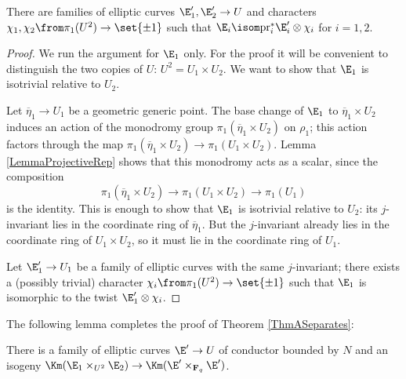 \documentclass{article}
\def\F{\mathbf{F}}
\begin{document}
\begin{lemma} \label{LemmaDescentToU} There are families of elliptic curves $\E_1',\E_2'\to U$ and characters 
$\chi_1,\chi_2\from \pi_1(U^2)\to \set{\pm{1}}$ such that $\E_i\isom \text{pr}_i^*\E_i'\otimes \chi_i$ for $i=1,2$.  
\end{lemma}

\begin{proof} We run the argument for $\E_1$ only.  For the proof it will be convenient to distinguish the two copies of $U$:  $U^2=U_1\times U_2$.  We want to show that $\E_1$ is isotrivial relative to $U_2$.  

Let $\overline{\eta}_1\to U_1$ be a geometric generic point.  The base change of $\E_1$ to $\overline{\eta}_1\times U_2$ induces an action of the monodromy group 
$\pi_1(\overline{\eta}_1\times U_2)$ on $\rho_1$;  this action factors through the map $\pi_1(\overline{\eta}_1\times U_2)\to\pi_1(U_1\times U_2)$.  Lemma \ref{LemmaProjectiveRep} shows that this monodromy acts as a scalar, since the composition 
\[ \pi_1(\overline{\eta}_1\times U_2)\to \pi_1(U_1\times U_2)\to \pi_1(U_1) \]
is the identity.  This is enough to show that $\E_1$ is isotrivial relative to $U_2$:  its $j$-invariant lies in the coordinate ring of $\overline{\eta}_1$.  But the $j$-invariant already lies in the coordinate ring of $U_1\times U_2$, so it must lie in the coordinate ring of $U_1$.  

 Let $\E_1'\to U_1$ be a family of elliptic curves with the same $j$-invariant;  there exists a (possibly trivial) character $\chi_i\from \pi_1(U^2)\to \set{\pm 1}$ such that $\E_1$ is isomorphic to the twist $\E_1'\otimes \chi_i$.
\end{proof}

The following lemma completes the proof of Theorem \ref{ThmASeparates}:

\begin{lemma}  There is a family of elliptic curves $\E'\to U$ of conductor bounded by $N$ and an isogeny $\Km(\E_1\times_{U^2} \E_2)\to \Km(\E'\times_{\F_q} \E')$.  
\end{lemma}
\end{document}
